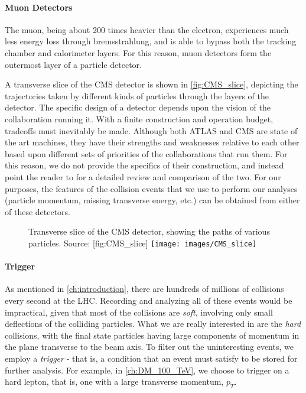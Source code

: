 \paragraph{Muon Detectors} The muon, being about 200 times heavier than the electron, experiences much less energy loss through bremsstrahlung, and is able to bypass both the tracking chamber and calorimeter layers. For this reason, muon detectors form the outermost layer of a particle detector.

A transverse slice of the CMS detector is shown in \autoref{fig:CMS_slice}, depicting the trajectories taken by different kinds of particles through the layers of the detector.
The specific design of a detector depends upon the vision of the collaboration running it. With a finite construction and operation budget, tradeoffs must inevitably be made. Although both ATLAS and CMS are state of the art machines, they have their strengths and weaknesses relative to each other based upon different sets of priorities of the collaborations that run them. For this reason, we do not provide the specifics of their construction, and instead point the reader to \citep{Froidevaux:2006rg} for a detailed review and comparison of the two.
For our purposes, the features of the collision events that we use to perform our analyses (particle momentum, missing transverse energy, etc.) can be obtained from either of these detectors.
\begin{figure}
  \begin{sidecaption}
    {Transverse slice of the CMS detector, showing the paths of various particles. Source: \citep{CMS_Slice}}[fig:CMS_slice]
    \centering
    \texttt{[image: images/CMS\_slice]}
  \end{sidecaption}
\end{figure}
\paragraph{Trigger} As mentioned in \autoref{ch:introduction}, there are hundreds of millions of collisions every second at the LHC. Recording and analyzing all of these events would be impractical, given that most of the collisions are \emph{soft}, involving only small deflections of the colliding particles. What we are really interested in are the \emph{hard} collisions, with the final state particles having large components of momentum in the plane transverse to the beam axis. To filter out the uninteresting events, we employ a \emph{trigger} - that is, a condition that an event must satisfy to be stored for further analysis. For example, in \autoref{ch:DM_100_TeV}, we choose to trigger on a hard lepton, that is, one with a large transverse momentum, $p_T$.

